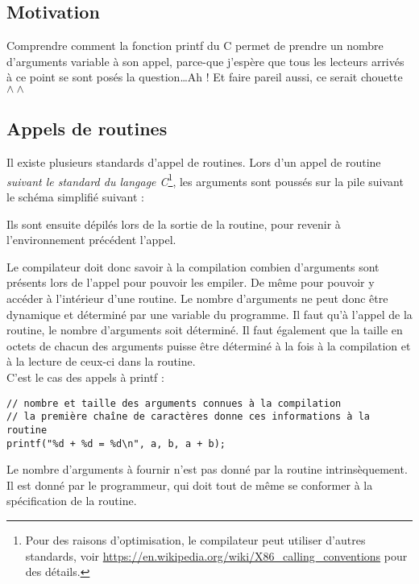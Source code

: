 \documentclass[../../../main.tex]{subfiles}
\begin{document}
\subsection{Motivation}
Comprendre comment la fonction \textsf{printf} du C permet de prendre un nombre d'arguments variable à son appel, parce-que j'espère que tous les lecteurs arrivés à ce point se sont posés la question\dots Ah ! Et faire pareil aussi, ce serait chouette $\wedge\wedge$
\subsection{Appels de routines}
Il existe plusieurs standards d'appel de routines. Lors d'un appel de routine \textit{suivant le standard du langage C}\footnote{Pour des raisons d'optimisation, le compilateur peut utiliser d'autres standards, voir \url{https://en.wikipedia.org/wiki/X86_calling_conventions} pour des détails.}, les arguments sont poussés sur la pile suivant le schéma simplifié suivant :

\begin{minipage}{\textwidth}
	\begin{center}
		\hspace{2.5cm}
	\end{center}
\end{minipage} 

Ils sont ensuite dépilés lors de la sortie de la routine, pour revenir à l'environnement précédent l'appel.

Le compilateur doit donc savoir à la compilation combien d'arguments sont présents lors de l'appel pour pouvoir les empiler. De même pour pouvoir y accéder à l'intérieur d'une routine. Le nombre d'arguments ne peut donc être dynamique et déterminé par une variable du programme. Il faut qu'à l'appel de la routine, le nombre d'arguments soit déterminé. Il faut également que la taille en octets de chacun des arguments puisse être déterminé à la fois à la compilation et à la lecture de ceux-ci dans la routine. \\
C'est le cas des appels à \textsf{printf} :
\begin{verbatim}
// nombre et taille des arguments connues à la compilation
// la première chaîne de caractères donne ces informations à la routine
printf("%d + %d = %d\n", a, b, a + b); 
\end{verbatim}
Le nombre d'arguments à fournir n'est pas donné par la routine intrinsèquement. Il est donné par le programmeur, qui doit tout de même se conformer à la spécification de la routine.
\end{document}
